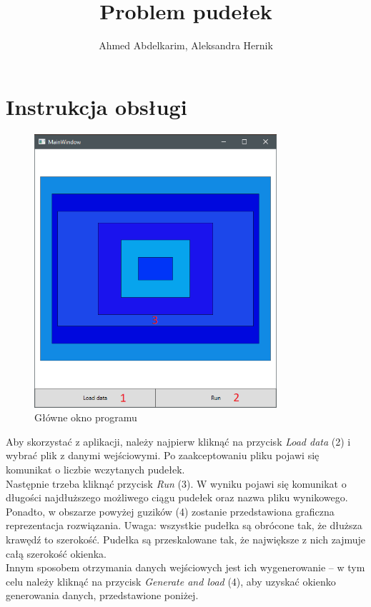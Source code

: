 \documentclass{article}
\title{Problem pudełek}
\author{Ahmed Abdelkarim, Aleksandra Hernik}
\begin{document}
\maketitle

\section{Instrukcja obsługi}
\begin{figure}[H]
\centering
\includegraphics[width=0.8\textwidth]{instrukcja.png}
\caption{Główne okno programu}
\end{figure}
Aby skorzystać z aplikacji, należy najpierw kliknąć na przycisk \textit{Load data} (2) i wybrać plik z danymi wejściowymi. Po zaakceptowaniu pliku pojawi się komunikat o liczbie wczytanych pudełek. \\
Następnie trzeba kliknąć przycisk \textit{Run} (3). W wyniku pojawi się komunikat o długości najdłuższego możliwego ciągu pudełek oraz nazwa pliku wynikowego. Ponadto, w obszarze powyżej guzików (4) zostanie przedstawiona graficzna reprezentacja rozwiązania. Uwaga: wszystkie pudełka są obrócone tak, że dłuższa krawędź to szerokość.  Pudełka są przeskalowane tak, że największe z nich zajmuje całą szerokość okienka. \\
Innym sposobem otrzymania danych wejściowych jest ich wygenerowanie -- w tym celu należy kliknąć na przycisk \textit{Generate and load} (4), aby uzyskać okienko generowania danych, przedstawione poniżej.
\end{document}
